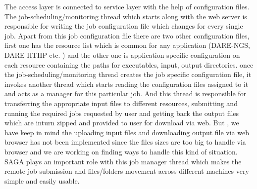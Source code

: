\documentclass{sig-alternate}
\begin{document}
The access layer is connected to service layer with the help of configuration files. The job-scheduling/monitoring thread  which starts along with the web server is responsible for writing the job configuration file which changes for every single job. Apart from this job configuration file there are two other configuration files, first one has the resource list which is common for any application  (DARE-NGS, DARE-HTHP etc. ) and the other one is application specific configuration on each resource containing the paths for executables, input, output directories. once the job-scheduling/monitoring thread creates the job specific configuration file, it invokes another thread which starts reading the configuration files assigned to it and acts as a manager for this particular job. And this thread is responsible for transferring the appropriate input files to different resources, submitting and running the required jobs requested by user and getting back the output files which are inturn zipped and provided to user for download via web. But , we have keep in mind the uploading input files and downloading output file via web browser has not been implemented since the files sizes are too big to handle via browser and we are working on finding ways to handle this kind of situation. SAGA plays an important role with this job manager thread which makes the remote job submission and files/folders movement across different machines very simple and easily usable.
\end{document}
